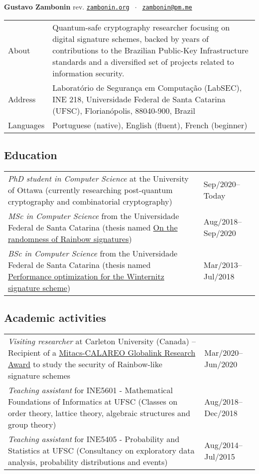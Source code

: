 \documentclass[12pt]{article}
\makeatletter
\newenvironment{sidetable}
  {\renewcommand{\arraystretch}{1.4}
   \newcolumntype{L}{>{\bf \raggedright}p{0.14\textwidth}}
   \newcolumntype{R}{p{0.82\textwidth}}
   \begin{tabular}{@{\hspace{0mm}}LR}}
  {\end{tabular}}
\newenvironment{contenttable}[1]
  {\subsection*{#1}
   \renewcommand{\arraystretch}{1.4}
   \newcolumntype{L}{p{0.82\textwidth}}
   \newcolumntype{R}{>{\raggedleft\arraybackslash}p{0.14\textwidth}}
   \begin{tabular}{@{\hspace{0mm}}LR}}
  {\end{tabular}}
\makeatother
\begin{document}
{\Large \textbf{Gustavo Zambonin}} {\tiny rev. \DTMtoday}
\hfill \href{https://zambonin.org}{\texttt{zambonin.org}}
    $\;\cdot\;$ \href{mailto:zambonin@pm.me}{\texttt{zambonin@pm.me}}

\begin{sidetable}
  About     & Quantum-safe cryptography researcher focusing on digital
              signature schemes, backed by years of contributions to the
              Brazilian Public-Key Infrastructure standards and a diversified
              set of projects related to information security. \\

  Address   & Laboratório de Segurança em Computação (LabSEC), INE 218,
              Universidade Federal de Santa Catarina (UFSC), Florianópolis,
              88040-900, Brazil \\

  Languages & Portuguese (native), English (fluent), French (beginner)
\end{sidetable}

\begin{contenttable}{Education}
  \emph{PhD student in Computer Science} at the University of Ottawa (currently
    researching post-quantum cryptography and combinatorial cryptography)
    & Sep/2020--Today \\

  \emph{MSc in Computer Science} from the Universidade Federal de Santa
    Catarina (thesis named
    \href{https://repositorio.ufsc.br/handle/123456789/219497}{On the
    randomness of Rainbow signatures})
    & Aug/2018--Sep/2020 \\

  \emph{BSc in Computer Science} from the Universidade Federal de Santa
    Catarina (thesis named
    \href{https://repositorio.ufsc.br/handle/123456789/187875}{Performance
    optimization for the Winternitz signature scheme})
    & Mar/2013--Jul/2018
\end{contenttable}

\begin{contenttable}{Academic activities}
  \emph{Visiting researcher} at Carleton University (Canada) -- Recipient of
    a \href{http://archive.is/RHxm4}{Mitacs-CALAREO Globalink Research Award}
    to study the security of Rainbow-like signature schemes
    & Mar/2020--Jun/2020 \\

  \emph{Teaching assistant} for INE5601 - Mathematical Foundations of
    Informatics at UFSC (Classes on order theory, lattice theory, algebraic
    structures and group theory)
    & Aug/2018--Dec/2018 \\

  \emph{Teaching assistant} for INE5405 - Probability and Statistics at UFSC
    (Consultancy on exploratory data analysis, probability distributions and
    events)
    & Aug/2014--Jul/2015
\end{contenttable}
\end{document}
